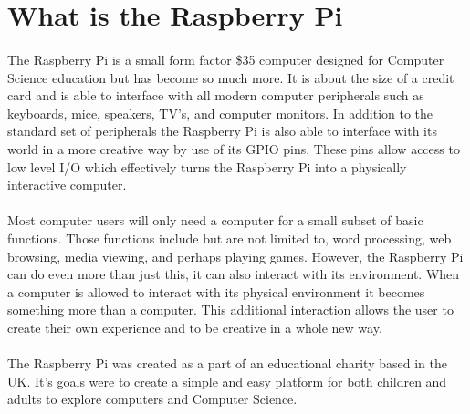 \documentclass[
10pt, %
a4paper, %
oneside, %
headinclude,footinclude, %
BCOR5mm, %
]{scrartcl}
\begin{document}

{\let\thefootnote\relax{}}


\newpage %

 
\section{What is the Raspberry Pi}

\paragraph{}
The Raspberry Pi is a small form factor \$35 computer designed for Computer Science education but has become so much more.
It is about the size of a credit card and is able to interface with all modern computer peripherals such as keyboards, mice, speakers, TV's, and computer monitors.
In addition to the standard set of peripherals the Raspberry Pi is also able to interface with its world in a more creative way by use of its GPIO pins.
These pins allow access to low level I/O which effectively turns the Raspberry Pi into a physically interactive computer.
\paragraph{}
Most computer users will only need a computer for a small subset of basic functions. Those functions include but are not limited to, word processing, web browsing, media viewing, and perhaps playing games.
However, the Raspberry Pi can do even more than just this, it can also interact with its environment.
When a computer is allowed to interact with its physical environment it becomes something more than a computer.
This additional interaction allows the user to create their own experience and to be creative in a whole new way.
\paragraph{}
The Raspberry Pi was created as a part of an educational charity based in the UK.
It's goals were to create a simple and easy platform for both children and adults to explore computers and Computer Science.
\end{document}
